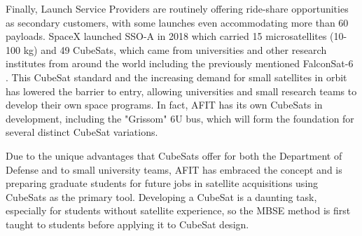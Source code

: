 Finally, Launch Service Providers are routinely offering ride-share opportunities as secondary customers, with some launches even accommodating more than 60 payloads. SpaceX launched SSO-A in 2018 which carried 15 microsatellites (10-100 kg) and 49 CubeSats, which came from universities and other research institutes from around the world including the previously mentioned FalconSat-6 \citep{eoPortal}. This CubeSat standard and the increasing demand for small satellites in orbit has lowered the barrier to entry, allowing universities and small research teams to develop their own space programs. In fact, AFIT has its own CubeSats in development, including the "Grissom" 6U bus, which will form the foundation for several distinct CubeSat variations. 

Due to the unique advantages that CubeSats offer for both the Department of Defense and to small university teams, AFIT has embraced the concept and is preparing graduate students for future jobs in satellite acquisitions using CubeSats as the primary tool. Developing a CubeSat is a daunting task, especially for students without satellite experience, so the MBSE method is first taught to students before applying it to CubeSat design.





